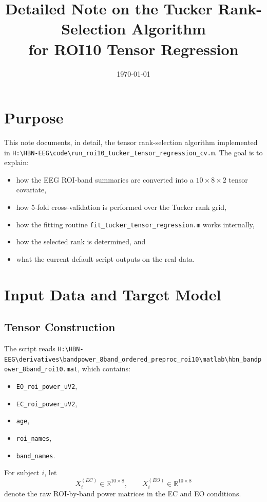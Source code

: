 \documentclass[11pt]{article}
\title{Detailed Note on the Tucker Rank-Selection Algorithm\\for ROI10 Tensor Regression}
\author{}
\date{\today}
\begin{document}
\maketitle

\section{Purpose}
This note documents, in detail, the tensor rank-selection algorithm implemented in
\texttt{H:\textbackslash HBN-EEG\textbackslash code\textbackslash run\_roi10\_tucker\_tensor\_regression\_cv.m}.
The goal is to explain:
\begin{itemize}[leftmargin=2em]
\item how the EEG ROI-band summaries are converted into a $10\times 8\times 2$ tensor covariate,
\item how 5-fold cross-validation is performed over the Tucker rank grid,
\item how the fitting routine \texttt{fit\_tucker\_tensor\_regression.m} works internally,
\item how the selected rank is determined, and
\item what the current default script outputs on the real data.
\end{itemize}

\section{Input Data and Target Model}
\subsection{Tensor Construction}
The script reads
\texttt{H:\textbackslash HBN-EEG\textbackslash derivatives\textbackslash bandpower\_8band\_ordered\_preproc\_roi10\textbackslash matlab\textbackslash hbn\_bandpower\_8band\_roi10.mat},
which contains:
\begin{itemize}[leftmargin=2em]
\item \texttt{EO\_roi\_power\_uV2},
\item \texttt{EC\_roi\_power\_uV2},
\item \texttt{age},
\item \texttt{roi\_names},
\item \texttt{band\_names}.
\end{itemize}

For subject $i$, let
\[
X_i^{(EC)} \in \mathbb{R}^{10\times 8}, \qquad
X_i^{(EO)} \in \mathbb{R}^{10\times 8}
\]
denote the raw ROI-by-band power matrices in the EC and EO conditions.
\end{document}
